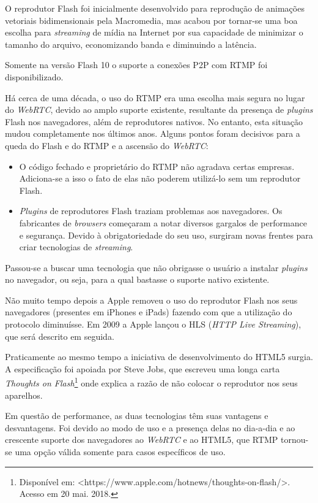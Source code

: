 O reprodutor Flash foi inicialmente desenvolvido para reprodução de animações vetoriais bidimensionais pela Macromedia, mas acabou por tornar-se uma boa escolha para \textit{streaming} de mídia na Internet por sua capacidade de minimizar o tamanho do arquivo, economizando banda e diminuindo a latência.

Somente na versão Flash 10 o suporte a conexões P2P com RTMP foi disponibilizado. 

Há cerca de uma década, o uso do RTMP era uma escolha mais segura no lugar do \textit{WebRTC}, devido ao amplo suporte existente, resultante da presença de \textit{plugins} Flash nos navegadores, além de reprodutores nativos. No entanto, esta situação mudou completamente nos últimos anos. Alguns pontos foram decisivos para a queda do Flash e do RTMP e a ascensão do \textit{WebRTC}:

\begin{itemize}
	\item O código fechado e proprietário do RTMP não agradava certas empresas. Adiciona-se a isso o fato de elas não poderem utilizá-lo sem um reprodutor Flash.
    \item \textit{Plugins} de reprodutores Flash traziam problemas aos navegadores. Os fabricantes de \textit{browsers} começaram a notar diversos gargalos de performance e segurança. Devido à obrigatoriedade do seu uso, surgiram novas frentes para criar tecnologias de \textit{streaming}.
\end{itemize}

Passou-se a buscar uma tecnologia que não obrigasse o usuário a instalar \textit{plugins} no navegador, ou seja, para a qual bastasse o suporte nativo existente.

Não muito tempo depois a Apple removeu o uso do reprodutor Flash nos seus navegadores (presentes em iPhones e iPads) fazendo com que a utilização do protocolo diminuísse. Em 2009 a Apple lançou o HLS (\textit{HTTP Live Streaming}), que será descrito em seguida.

Praticamente ao mesmo tempo a iniciativa de desenvolvimento do HTML5 surgia. A especificação foi apoiada por Steve Jobs, que escreveu uma longa carta \textit{Thoughts on Flash}\footnote{Disponível em: <https://www.apple.com/hotnews/thoughts-on-flash/>. Acesso em 20 mai. 2018.} onde explica a razão de não colocar o reprodutor nos seus aparelhos.

Em questão de performance, as duas tecnologias têm suas vantagens e desvantagens. Foi devido ao modo de uso e a presença delas no dia-a-dia e ao crescente suporte dos navegadores ao \textit{WebRTC} e ao HTML5, que RTMP tornou-se uma opção válida somente para casos específicos de uso.

